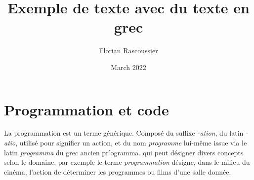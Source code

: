 \documentclass[12pt]{article} %
\title{Exemple de texte avec du texte en grec}
\author{Florian Rascoussier}
\date{March 2022}
\begin{document}
\maketitle

\section{Programmation et code}
La programmation est un terme générique. Composé du suffixe \textit{-ation}, du latin \textit{-atio}, utilisé pour signifier un action, et du nom \textit{programme} lui-même issue via le latin \textit{programma} du grec ancien \textgreek{pr'ogramma}.
qui peut désigner divers concepts selon le domaine, par exemple le terme \textit{programmation} désigne, dans le milieu du cinéma, l'action de déterminer les programmes ou films d'une salle donnée.
\end{document}
